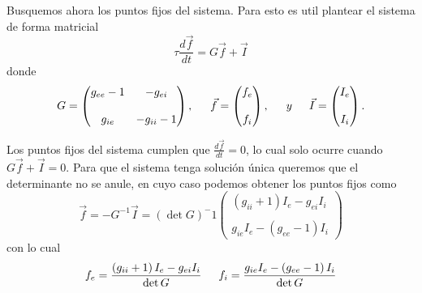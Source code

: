 Busquemos ahora los puntos fijos del sistema. Para esto es util plantear el sistema de forma matricial
\begin{equation}
    \tau \frac{d\vec{f}}{dt} = G \vec{f} + \vec{I}
\end{equation}
donde
\begin{equation}
    G =
    \begin{pmatrix}
        g_{ee} - 1  & - g_{ei}      \\ \\
        g_{ie}      & - g_{ii} - 1 
    \end{pmatrix},
    \indent
    \vec{f} =
    \begin{pmatrix}
        f_e  \\ \\
        f_i       
    \end{pmatrix},
    \indent y \indent
    \vec{I} = 
    \begin{pmatrix}
        I_e  \\ \\
        I_i       
    \end{pmatrix}.
\end{equation}

Los puntos fijos del sistema cumplen que $\frac{d\vec{f}}{dt} = 0$, lo cual solo ocurre cuando $G\vec{f} + \vec{I} = 0$. Para que el sistema tenga solución única queremos que el determinante no se anule, en cuyo caso podemos obtener los puntos fijos como
\begin{equation}
    \vec{f} = - G^{-1} \vec{I} = \left(\det G\right)^-1
    \begin{pmatrix}
        \left(g_{ii} + 1\right) I_{e} -g_{ei} I_{i}          \\ \\
        g_{ie} I_e - \left( g_{ee} - 1 \right) I_{i}      
    \end{pmatrix}
\end{equation}
con lo cual
\begin{equation}
    f_e = \frac{\left(g_{ii} + 1\right) I_{e} -g_{ei} I_{i}}{\det G} \indent f_i = \frac{g_{ie} I_e - \left( g_{ee} - 1 \right) I_{i}}{\det G}
    \label{02:Puntos_fijos}
\end{equation}

